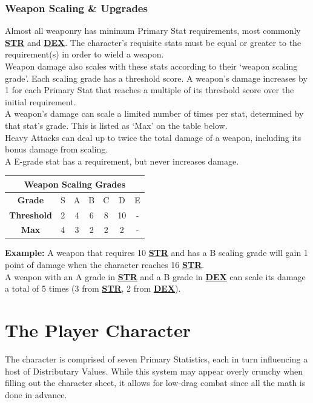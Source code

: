 \documentclass[12pt]{article}
\newcommand{\refto}[1]{\hyperlink{#1}{\textbf{#1}}}
\begin{document}
\begin{multicols*}{2}
\subsubsection{Weapon Scaling \& Upgrades}
Almost all weaponry has minimum Primary Stat requirements, most commonly \refto{STR} and \refto{DEX}. The character’s requisite stats must be equal or greater to the requirement(s) in order to wield a weapon.\\
Weapon damage also scales with these stats according to their ‘weapon scaling grade’. Each scaling grade has a threshold score. A weapon’s damage increases by 1 for each Primary Stat that reaches a multiple of its threshold score over the initial requirement. \\
A weapon’s damage can scale a limited number of times per stat, determined by that stat’s grade. This is listed as ‘Max’ on the table below.\\
Heavy Attacks can deal up to twice the total damage of a weapon, including its bonus damage from scaling.\\
A E-grade stat has a requirement, but never increases damage.\\
\setlength{\tabcolsep}{10pt}
\renewcommand{\arraystretch}{1.5}
\begin{center}
\begin{tabular}{ |c|c|c|c|c|c|c| }
\hline
\multicolumn{7}{|c|}{\textbf{Weapon Scaling Grades}}\\
\hline
\textbf{Grade} & S & A & B & C & D & E \\
\hline
\textbf{Threshold} & 2 & 4 & 6 & 8 & 10 & - \\ 
\hline
\textbf{Max} & 4 & 3 & 2 & 2 & 2 & - \\
\hline
\end{tabular}
\end{center}

\begin{tcolorbox}
\textbf{Example:} A weapon that requires 10 \refto{STR} and has a B scaling grade will gain 1 point of damage when the character reaches 16 \refto{STR}.\\
A weapon with an A grade in \refto{STR} and a B grade in \refto{DEX} can scale its damage a total of 5 times (3 from \refto{STR}, 2 from \refto{DEX}).
\end{tcolorbox}

\vfill
\pagebreak

\section{The Player Character}
The character is comprised of seven Primary Statistics, each in turn influencing a host of Distributary Values. While this system may appear overly crunchy when filling out the character sheet, it allows for low-drag combat since all the math is done in advance.\\


\end{multicols*}
\end{document}
